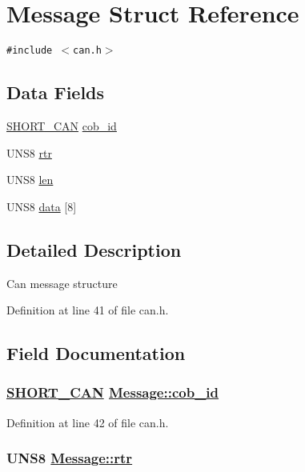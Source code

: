 \hypertarget{structMessage}{
\section{Message Struct Reference}
\label{structMessage}
}
{\tt \#include $<$can.h$>$}

\subsection*{Data Fields}
\begin{CompactItemize}
\item 
\hyperlink{structSHORT__CAN}{SHORT\_\-CAN} \hyperlink{structMessage_c5d40bde75d015beb48293c052a218b5}{cob\_\-id}
\item 
UNS8 \hyperlink{structMessage_41c5a4e7eaeb2c2ae1af2b2c83129615}{rtr}
\item 
UNS8 \hyperlink{structMessage_d1dd9a88dda088ff4c7073d49613613d}{len}
\item 
UNS8 \hyperlink{structMessage_229865b09691e658677ba76f2d82ce89}{data} \mbox{[}8\mbox{]}
\end{CompactItemize}


\subsection{Detailed Description}
Can message structure 



Definition at line 41 of file can.h.

\subsection{Field Documentation}
\hypertarget{structMessage_c5d40bde75d015beb48293c052a218b5}{
\subsubsection[cob\_\-id]{\setlength{\rightskip}{0pt plus 5cm}\hyperlink{structSHORT__CAN}{SHORT\_\-CAN} \hyperlink{structMessage_c5d40bde75d015beb48293c052a218b5}{Message::cob\_\-id}}}
\label{structMessage_c5d40bde75d015beb48293c052a218b5}




Definition at line 42 of file can.h.\hypertarget{structMessage_41c5a4e7eaeb2c2ae1af2b2c83129615}{
\subsubsection[rtr]{\setlength{\rightskip}{0pt plus 5cm}UNS8 \hyperlink{structMessage_41c5a4e7eaeb2c2ae1af2b2c83129615}{Message::rtr}}}
\label{structMessage_41c5a4e7eaeb2c2ae1af2b2c83129615}




